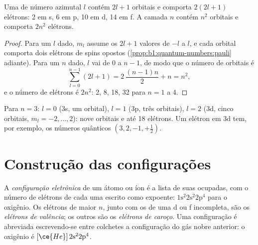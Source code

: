 \begin{proposition}\label{prop:b1:quantum-numbers:capacity}
Uma  de número azimutal $l$ contém $2l + 1$ orbitais e comporta
$2(2l + 1)$ elétrons: 2 em s, 6 em p, 10 em d, 14 em f. A camada $n$
contém $n^2$ orbitais e comporta $2n^2$ elétrons.
\end{proposition}

\begin{proof}
Para um $l$ dado, $m_l$ assume os $2l + 1$ valores de $-l$ a $l$, e
cada orbital comporta dois elétrons de spins opostos (\cref{prop:b1:quantum-numbers:pauli}
adiante). Para um $n$ dado, $l$ vai de $0$ a $n - 1$, de modo que o
número de orbitais é
\[
  \sum_{l=0}^{n-1} (2l+1) = 2\,\frac{(n-1)n}{2} + n = n^2 ,
\]
e o número de elétrons é $2n^2$: 2, 8, 18, 32 para $n = 1$ a 4.
\end{proof}

\begin{example}\label{ex:b1:quantum-numbers:third}
Para $n = 3$: $l = 0$ (3s, um orbital), $l = 1$ (3p, três orbitais),
$l = 2$ (3d, cinco orbitais, $m_l = -2, \dots, 2$): nove orbitais e até
18 elétrons. Um elétron em 3d tem, por exemplo, os números
quânticos $(3, 2, -1, +\tfrac12)$.
\end{example}

\section{Construção das configurações}

\begin{definition}\label{def:b1:quantum-numbers:configuration}
A \emph{configuração eletrônica} de um
átomo ou íon é a lista de suas  ocupadas, com o número de
elétrons de cada uma escrito como expoente: $1\text{s}^2 2\text{s}^2
2\text{p}^4$ para o oxigênio. Os elétrons de maior $n$, junto com os de
uma  d ou f incompleta, são os \emph{elétrons de
valência}; os outros são os \emph{elétrons de
caroço}. Uma configuração é abreviada
escrevendo-se entre colchetes a configuração do gás nobre anterior:
o oxigênio é $[\ce{He}]\,2\text{s}^2 2\text{p}^4$.
\end{definition}

